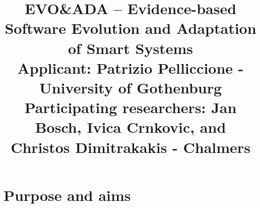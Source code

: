 \documentclass[12pt]{article}
\date{}
\begin{document}
\title{\vspace{-2cm} EVO\&ADA -- Evidence-based Software Evolution and Adaptation of Smart Systems\\ \vspace{.2cm} {\normalsize {\bf Applicant}: Patrizio Pelliccione - University of Gothenburg}\\ \vspace{-.2cm} {\normalsize {\bf Participating researchers}: Jan Bosch, Ivica Crnkovic, and Christos Dimitrakakis - Chalmers}}

\renewcommand{\footskip}{20pt}
 
\newcommand{\name}{{\tt EVO\&ADA}} 

\maketitle

\vspace{-2.5cm}

\section{Purpose and aims}\label{sec:purpose}
 
\end{document}

